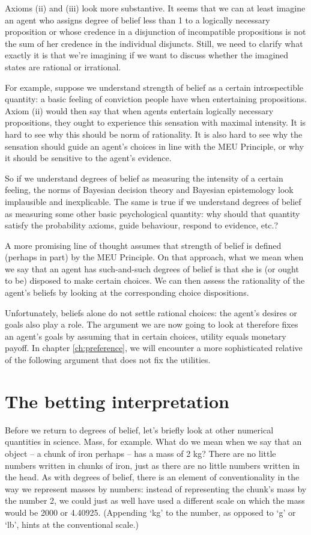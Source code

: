 Axioms (ii) and (iii) look more substantive. It seems that we can at
least imagine an agent who assigns degree of belief less than 1 to a
logically necessary proposition or whose credence in a disjunction of
incompatible propositions is not the sum of her credence in the
individual disjuncts. Still, we need to clarify what exactly it is
that we're imagining if we want to discuss whether the imagined states
are rational or irrational.

For example, suppose we understand strength of belief as a certain
introspectible quantity: a basic feeling of conviction people have
when entertaining propositions. Axiom (ii) would then say that when
agents entertain logically necessary propositions, they ought to
experience this sensation with maximal intensity. It is hard to see
why this should be norm of rationality. It is also hard to see why
the sensation should guide an agent's choices in line with the MEU
Principle, or why it should be sensitive to the agent's evidence.

So if we understand degrees of belief as measuring the intensity of a
certain feeling, the norms of Bayesian decision theory and Bayesian
epistemology look implausible and inexplicable. The same is true if we
understand degrees of belief as measuring some other basic
psychological quantity: why should that quantity satisfy the
probability axioms, guide behaviour, respond to evidence, etc.?

A more promising line of thought assumes that strength of belief is
defined (perhaps in part) by the MEU Principle. On that approach, what
we mean when we say that an agent has such-and-such degrees of belief
is that she is (or ought to be) disposed to make certain choices. We
can then assess the rationality of the agent's beliefs by looking at
the corresponding choice dispositions.

Unfortunately, beliefs alone do not settle rational choices: the
agent's desires or goals also play a role. The argument we are now
going to look at therefore fixes an agent's goals by assuming that in
certain choices, utility equals monetary payoff. In chapter
\ref{ch:preference}, we will encounter a more sophisticated relative
of the following argument that does not fix the utilities.

\section{The betting interpretation}

Before we return to degrees of belief, let's briefly look at other
numerical quantities in science. Mass, for example. What do we mean
when we say that an object -- a chunk of iron perhaps -- has a mass of
2 kg? There are no little numbers written in chunks of iron, just as
there are no little numbers written in the head. As with degrees of
belief, there is an element of conventionality in the way we represent
masses by numbers: instead of representing the chunk's mass by the
number 2, we could just as well have used a different scale on which
the mass would be 2000 or 4.40925. (Appending `kg' to the number, as
opposed to `g' or `lb', hints at the conventional scale.)

